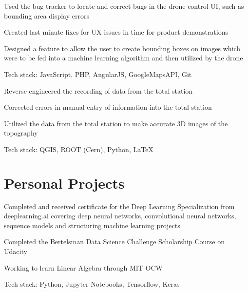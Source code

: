 \documentclass[letterpaper]{resume}
\begin{document}
\begin{compactitem}
\item Used the bug tracker to locate and correct bugs in the drone control UI, such as bounding area display errors
\item Created last minute fixes for UX issues in time for product demonstrations
\item Designed a feature to allow the user to create bounding boxes on images which were to be fed into a machine learning algorithm and then utilized by the drone
\item Tech stack: JavaScript, PHP, AngularJS, GoogleMapsAPI, Git
\end{compactitem}

\begin{compactitem}
\item Reverse engineered the recording of data from the total station
\item Corrected errors in manual entry of information into the total station 
\item Utilized the data from the total station to make accurate 3D images of the topography
\item Tech stack: QGIS, ROOT (Cern), Python, LaTeX
\end{compactitem}

\section{Personal Projects}

\begin{compactitem}
\item Completed and received certificate for the Deep Learning Specialization from deeplearning.ai covering deep neural networks, convolutional neural networks, sequence models and structuring machine learning projects
\item Completed the Bertelsman Data Science Challenge Scholarship Course on Udacity
\item Working to learn Linear Algebra through MIT OCW
\item Tech stack: Python, Jupyter Notebooks, Tensorflow, Keras
\end{compactitem}
\end{document}
